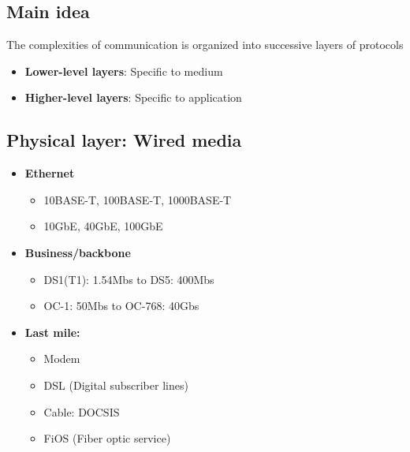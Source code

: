 \documentclass{report}
\begin{document}
     \bigbreak \noindent 
     \subsection{Main idea}
     \bigbreak \noindent 
     The complexities of communication is organized into successive layers of protocols
     \begin{itemize}
         \item \textbf{Lower-level layers}: Specific to medium
         \item \textbf{Higher-level layers}: Specific to application
     \end{itemize}
     \pagebreak 
     \subsection{Physical layer: Wired media}
     \begin{itemize}
         \item \textbf{Ethernet}
             \begin{itemize}
                 \item 10BASE-T, 100BASE-T, 1000BASE-T
                \item 10GbE, 40GbE, 100GbE
             \end{itemize}
         \item \textbf{Business/backbone}
             \begin{itemize}
                 \item DS1(T1): 1.54Mbs to DS5: 400Mbs
                    \item OC-1: 50Mbs to OC-768: 40Gbs
             \end{itemize}
            \item \textbf{Last mile:}
                \begin{itemize}
                    \item Modem
                    \item DSL (Digital subscriber lines)
                    \item Cable: DOCSIS
                    \item FiOS (Fiber optic service)
                \end{itemize}
     \end{itemize}

     \bigbreak \noindent 
\end{document}
